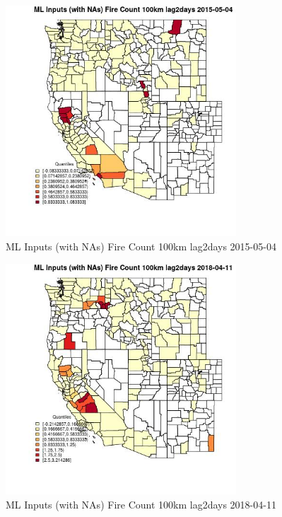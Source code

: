 \begin{figure} 
\centering  
\includegraphics[width=0.77\textwidth]{Code_Outputs/Report_ML_input_PM25_Step4_part_e_de_duplicated_aves_compiled_2019-05-18wNAs_CountyFire_Count_100km_lag2daysMean2015-05-04_2015-05-04.jpg} 
\caption{\label{fig:Report_ML_input_PM25_Step4_part_e_de_duplicated_aves_compiled_2019-05-18wNAsCountyFire_Count_100km_lag2daysMean2015-05-04_2015-05-04}ML Inputs (with NAs) Fire Count 100km lag2days 2015-05-04} 
\end{figure} 
 

\clearpage 

\begin{figure} 
\centering  
\includegraphics[width=0.77\textwidth]{Code_Outputs/Report_ML_input_PM25_Step4_part_e_de_duplicated_aves_compiled_2019-05-18wNAs_CountyFire_Count_100km_lag2daysMean2018-04-11_2018-04-11.jpg} 
\caption{\label{fig:Report_ML_input_PM25_Step4_part_e_de_duplicated_aves_compiled_2019-05-18wNAsCountyFire_Count_100km_lag2daysMean2018-04-11_2018-04-11}ML Inputs (with NAs) Fire Count 100km lag2days 2018-04-11} 
\end{figure} 
 


